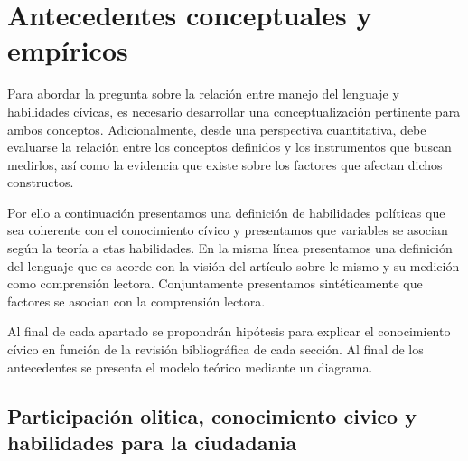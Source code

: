 \documentclass[12pt,twoside]{templates/facsothesis}
\begin{document}
\hypertarget{antecedentes-conceptuales-y-empuxedricos}{%
\chapter{Antecedentes conceptuales y empíricos}\label{antecedentes-conceptuales-y-empuxedricos}}

Para abordar la pregunta sobre la relación entre manejo del lenguaje y habilidades cívicas, es necesario desarrollar una conceptualización pertinente para ambos conceptos. Adicionalmente, desde una perspectiva cuantitativa, debe evaluarse la relación entre los conceptos definidos y los instrumentos que buscan medirlos, así como la evidencia que existe sobre los factores que afectan dichos constructos.

Por ello a continuación presentamos una definición de habilidades políticas que sea coherente con el conocimiento cívico y presentamos que variables se asocian según la teoría a etas habilidades. En la misma línea presentamos una definición del lenguaje que es acorde con la visión del artículo sobre le mismo y su medición como comprensión lectora. Conjuntamente presentamos sintéticamente que factores se asocian con la comprensión lectora.

Al final de cada apartado se propondrán hipótesis para explicar el conocimiento cívico en función de la revisión bibliográfica de cada sección. Al final de los antecedentes se presenta el modelo teórico mediante un diagrama.

\hypertarget{participaciuxf3n-olitica-conocimiento-civico-y-habilidades-para-la-ciudadania}{%
\section{Participación olitica, conocimiento civico y habilidades para la ciudadania}\label{participaciuxf3n-olitica-conocimiento-civico-y-habilidades-para-la-ciudadania}}
\end{document}
